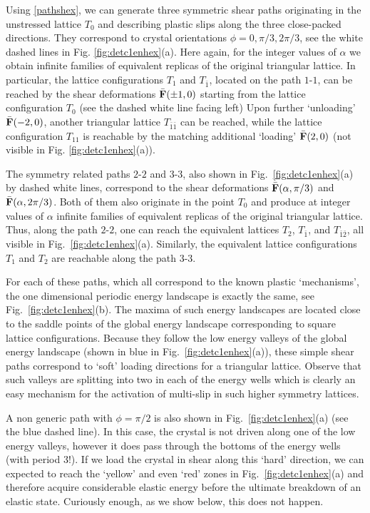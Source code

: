 \documentclass[CRPHYS,Unicode,manuscript]{cedram}
\begin{document}
Using \eqref{pathshex},   we can generate    three symmetric shear paths  originating in the unstressed lattice  $T_0$ and  describing plastic slips along the  three   close-packed directions.  They correspond to crystal orientations  $\phi=0,\pi/3,2\pi/3$, see the white dashed lines in  Fig. \ref{fig:detc1enhex}(a).  Here again,  for the integer values of  $\alpha$  we obtain  infinite families  of equivalent  replicas of the original triangular  lattice. In particular,  the   lattice configurations   $T_{1}$ and $T_{\bar 1}$,  located on the path $1$-$1$,  can be  reached by the shear deformations $\bar{\bf F}(\pm1, 0)$ starting from the lattice configuration  $T_{0}$ (see the dashed white line facing left)  Upon further   `unloading'   $\bar{\bf F}(-2, 0)$, another  triangular lattice  $T_{\bar 1\bar 1}$ can be reached, while the  lattice configuration $T_{1 1}$ is reachable by the matching additional  `loading'  $\bar{\bf F}( 2, 0)$ (not visible in Fig. \ref{fig:detc1enhex}(a)).
  
The symmetry related  paths  $2$-$2$  and $3$-$3$, also shown in Fig.~\ref{fig:detc1enhex}(a)  by dashed white lines, correspond to  the shear deformations  $\bar{\bf F}(\alpha, \pi/3)$  and $\bar{\bf F}(\alpha, 2\pi/3)$. Both of them also originate in the point  $T_{0}$ and produce at integer values of  $\alpha$   infinite families  of equivalent  replicas of the original triangular  lattice.  Thus, along the path $2$-$2$, one  can reach  the  equivalent  lattices    $T_{2}$, $T_{\bar 1}$, and  $T_{\bar 1\bar 2}$, all visible in Fig.~\ref{fig:detc1enhex}(a). Similarly,   the equivalent   lattice configurations   $T_{1}$ and  $T_{2}$ are reachable along  the path  $3$-$3$.  
 
 For each of these paths, which all correspond to the known plastic `mechanisms',  the one dimensional periodic energy landscape is exactly the same, see  Fig.~\ref{fig:detc1enhex}(b). The maxima of such energy landscapes are located close to the saddle points of the global energy landscape corresponding to square lattice configurations. Because they follow the low energy valleys of the global energy landscape (shown in blue in Fig.~\ref{fig:detc1enhex}(a)), these simple shear paths  correspond to  `soft' loading directions for a triangular lattice.  Observe  that such valleys  are  splitting  into two in each of the energy wells which is clearly an easy  mechanism for the  activation of multi-slip in such higher symmetry lattices.

A     non generic   path with $\phi=\pi/2$ is also shown  in Fig.~\ref{fig:detc1enhex}(a) (see the blue dashed line). In this case, the crystal is not driven along one of the  low energy valleys,  however it  does   pass through   the  bottoms of the energy wells (with period 3!). If we  load the  crystal  in shear along  this `hard' direction,  we can  expected to reach the `yellow' and even `red' zones in Fig.~\ref{fig:detc1enhex}(a) and therefore acquire considerable elastic energy before the ultimate breakdown of an elastic state. Curiously enough, as we show below, this does not happen.
\end{document}

